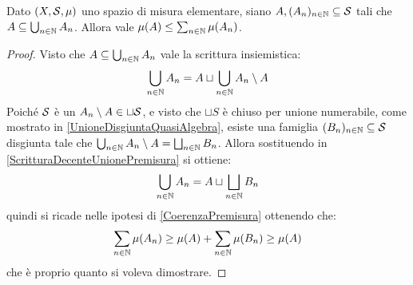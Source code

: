 \begin{lemma}\label{PiuCheMonotonaPremisura}
	Dato $(X,\S,\mu)$ uno spazio di misura elementare, siano $A,(A_n)_{n\in\N}\subseteq \S$ tali che $A\subseteq\bigcup_{n\in\N}A_n$.
	Allora vale $\mu(A)\le \sum_{n\in\N}\mu(A_n)$.
\end{lemma}
\begin{proof}
	Visto che $A\subseteq\bigcup_{n\in\N}A_n$ vale la scrittura insiemistica:
	\begin{equation}\label{ScritturaDecenteUnionePremisura}
		\bigcup_{n\in\N}A_n=A\sqcup\bigcup_{n\in\N}A_n\setminus A
	\end{equation}
	Poiché $\S$ è un \semiring{} $A_n\setminus A\in \sqcup \S$, e visto che $\sqcup S$ è chiuso per unione numerabile, come mostrato in \cref{UnioneDisgiuntaQuasiAlgebra}, esiste una famiglia $(B_n)_{n\in\N}\subseteq\S$ disgiunta tale che $\bigcup_{n\in\N}A_n\setminus A=\bigsqcup_{n\in\N}B_n$.
	Allora sostituendo in \cref{ScritturaDecenteUnionePremisura} si ottiene:
	\begin{equation*}
		\bigcup_{n\in\N}A_n=A\sqcup\bigsqcup_{n\in\N}B_n
	\end{equation*}
	quindi si ricade nelle ipotesi di \cref{CoerenzaPremisura} ottenendo che:
	\begin{equation*}
		\sum_{n\in\N}\mu(A_n)\ge \mu(A)+\sum_{n\in\N}\mu(B_n)\ge \mu(A)
	\end{equation*}
	che è proprio quanto si voleva dimostrare.

\end{proof}



